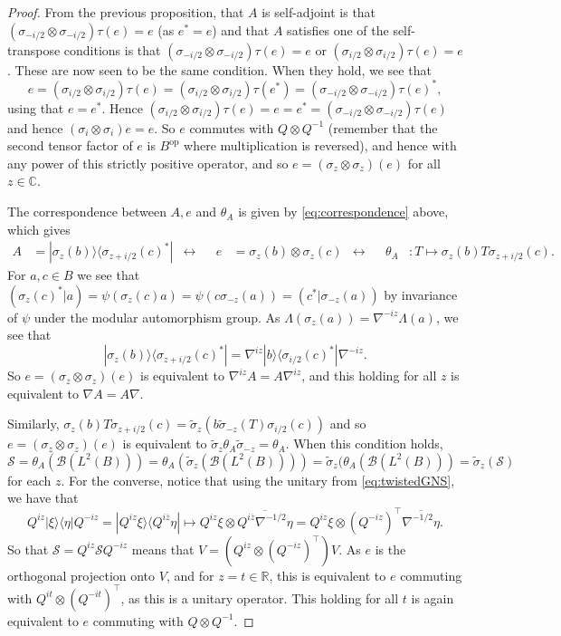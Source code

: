 \documentclass[a4paper,11pt]{article}
\theoremstyle{plain}
\theoremstyle{remark}
\newcommand{\mc}[1]{\mathcal{#1}}
\newcommand{\op}{{\operatorname{op}}}
\begin{document}
\begin{proof}
From the previous proposition, that $A$ is self-adjoint is that $(\sigma_{-i/2}\otimes\sigma_{-i/2})\tau(e) = e$ (as $e^*=e$) and that $A$ satisfies one of the self-transpose conditions is that $ (\sigma_{-i/2}\otimes\sigma_{-i/2})\tau(e)=e$ or $(\sigma_{i/2}\otimes\sigma_{i/2})\tau(e) =e$.  These are now seen to be the same condition.  When they hold, we see that
\[ e = (\sigma_{i/2}\otimes\sigma_{i/2})\tau(e) = (\sigma_{i/2}\otimes\sigma_{i/2})\tau(e^*) = (\sigma_{-i/2}\otimes\sigma_{-i/2})\tau(e)^*, \]
using that $e=e^*$.  Hence $(\sigma_{i/2}\otimes\sigma_{i/2})\tau(e) = e = e^* = (\sigma_{-i/2}\otimes\sigma_{-i/2})\tau(e)$ and hence $(\sigma_{i}\otimes\sigma_{i})e = e$.  So $e$ commutes with $Q\otimes Q^{-1}$ (remember that the second tensor factor of $e$ is $B^\op$ where multiplication is reversed), and hence with any power of this strictly positive operator, and so $e = (\sigma_z\otimes\sigma_z)(e)$ for all $z\in\mathbb C$.

The correspondence between $A,e$ and $\theta_A$ is given by \eqref{eq:correspondence} above, which gives
\begin{align*}
A &= |\sigma_z(b)\rangle \langle \sigma_{z+i/2}(c)^* | 
&\leftrightarrow&&
e &= \sigma_z(b) \otimes \sigma_z(c)
&\leftrightarrow&&
\theta_A &\colon T \mapsto \sigma_z(b)T \sigma_{z+i/2}(c).
\end{align*}
For $a,c\in B$ we see that $(\sigma_z(c)^*|a) = \psi(\sigma_z(c)a) = \psi(c\sigma_{-z}(a)) = (c^*|\sigma_{-z}(a))$ by invariance of $\psi$ under the modular automorphism group.  As $\Lambda(\sigma_z(a)) = \nabla^{-iz}\Lambda(a)$, we see that
\[ |\sigma_z(b)\rangle \langle \sigma_{z+i/2}(c)^* |
= \nabla^{iz} |b\rangle \langle \sigma_{i/2}(c)^* | \nabla^{-iz}. \]
So $e = (\sigma_z\otimes\sigma_z)(e)$ is equivalent to $\nabla^{iz} A = A\nabla^{iz}$, and this holding for all $z$ is equivalent to $\nabla A = A\nabla$.

Similarly, $\sigma_z(b)T \sigma_{z+i/2}(c) = \tilde\sigma_z( b \tilde\sigma_{-z}(T) \sigma_{i/2}(c) )$ and so $e = (\sigma_z\otimes\sigma_z)(e)$ is equivalent to $\tilde\sigma_z \theta_A \tilde\sigma_{-z} = \theta_A$.  When this condition holds, $\mc S = \theta_A(\mc B(L^2(B))) = \theta_A(\tilde\sigma_z(\mc B(L^2(B)))) = \tilde\sigma_z(\theta_A(\mc B(L^2(B))) = \tilde\sigma_z(\mc S)$ for each $z$.  For the converse, notice that using the unitary from \eqref{eq:twistedGNS}, we have that
\[ Q^{iz} |\xi\rangle\langle\eta| Q^{-iz}
= |Q^{iz}\xi\rangle \langle Q^{i\overline z}\eta|
\mapsto Q^{iz}\xi \otimes \overline{Q^{i\overline z}\nabla^{-1/2}\eta}
= Q^{iz}\xi \otimes (Q^{-iz})^\top \overline{ \nabla^{-1/2}\eta }. \]
So that $\mc S = Q^{iz} \mc S Q^{-iz}$ means that $V = (Q^{iz} \otimes (Q^{-iz})^\top)V$.  As $e$ is the orthogonal projection onto $V$, and for $z=t\in\mathbb R$, this is equivalent to $e$ commuting with $Q^{it} \otimes (Q^{-it})^\top$, as this is a unitary operator.  This holding for all $t$ is again equivalent to $e$ commuting with $Q\otimes Q^{-1}$.
\end{proof}
\end{document}
